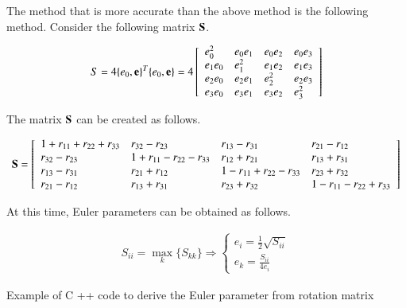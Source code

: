 The method that is more accurate than the above method is the following method.
Consider the following matrix $\mathbf{S}$.

\begin{eqnarray}
S=4\{e_0,\mathbf{e}\}^T\{e_0,\mathbf{e}\}
=
4\left[\begin{array}{llll}
e_0^2 & e_0e_1 & e_0e_2 & e_0e_3\\
e_1e_0 & e_1^2 & e_1e_2 & e_1e_3 \\
e_2e_0 & e_2e_1 & e_2^2 & e_2e_3\\
e_3e_0 & e_3e_1 & e_3e_2 & e_3^2
\end{array}\right]
\end{eqnarray}

The matrix $\mathbf{S}$ can be created as follows.

\begin{eqnarray}
\mathbf{S}
=
\left[\begin{array}{llll}
1+r_{11}+r_{22}+r_{33} & r_{32}-r_{23} & r_{13}-r_{31} & r_{21} - r_{12} \\
r_{32} - r_{23} & 1+r_{11}-r_{22}-r_{33} & r_{12}+r_{21} & r_{13}+r_{31} \\
r_{13}-r_{31} & r_{21}+r_{12} & 1-r_{11}+r_{22}-r_{33} & r_{23}+r_{32} \\
r_{21}-r_{12} & r_{13}+r_{31} & r_{23} + r_{32} & 1-r_{11}-r_{22}+r_{33}
\end{array}\right]
\end{eqnarray}

At this time, Euler parameters can be obtained as follows.

\begin{eqnarray}
S_{ii} = \max_k\{S_{kk}\}
\Rightarrow
\left\{\begin{array}{l}
e_i = \frac{1}{2}\sqrt{S_{ii}}\\
e_k = \frac{S_{ii}}{4e_i}
\end{array}\right.
\end{eqnarray}


Example of C ++ code to derive the Euler parameter from rotation matrix

